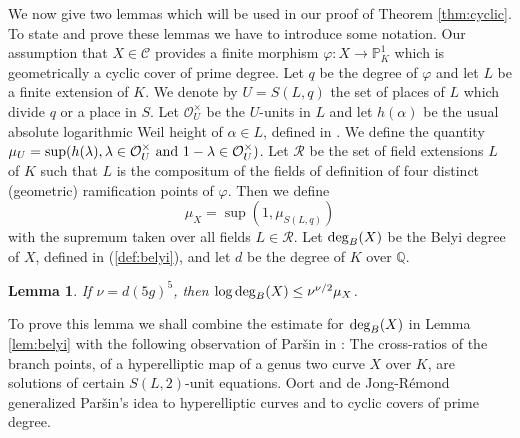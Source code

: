 \documentclass[11pt]{article}
\newtheorem{lemma}[theorem]{Lemma}
\numberwithin{equation}{section}
\def\deg{\textnormal{deg}}
\newcommand {\QQ}  {{\mathbb Q}}
\begin{document}
We now give two lemmas which will be used in our proof of Theorem \ref{thm:cyclic}. 
To state and prove these lemmas we have to introduce some notation. 
Our assumption that $X\in \mathcal C$ provides a finite morphism $\varphi: X\to \mathbb P^1_K$ which is geometrically a cyclic cover of prime degree. 
Let $q$ be the degree of $\varphi$ and let $L$ be a finite extension  of $K$. 
We denote by $U=S(L,q)$ the set of places of $L$ which divide $q$ or a place in $S$. 
Let $\mathcal O_U^{\times}$ be the $U$-units in $L$ and let $h(\alpha)$ be the
 usual absolute logarithmic Weil height of $\alpha\in L$, defined in \cite[1.6.1]{bogu:diophantinegeometry}. 
We define the quantity $\mu_{U}=\sup(h(\lambda), \lambda \in \mathcal O_U^\times \textnormal{ and }  1-\lambda \in \mathcal O_U^{\times})$. 
Let $\mathcal R$ be the set of field extensions $L$ of $K$ such that $L$ is the
compositum of the fields of definition of four distinct (geometric) ramification points of $\varphi$. 
Then we define 
\begin{equation}\label{def:ux}
\mu_X=\sup(1,\mu_{S(L,q)})
\end{equation}
with the supremum taken over all fields $L\in \mathcal R$. Let $\deg_B(X)$ be the Belyi degree of $X$, defined in (\ref{def:belyi}), and let $d$ be the degree of $K$ over $\QQ$.
\begin{lemma}\label{lem:degbux}
If $\nu=d(5g)^5$, then $\log\deg_{B}(X) \leq \nu^{\nu/2}\mu_X$.
\end{lemma}
To prove this lemma we shall combine the estimate for $\deg_B(X)$ in Lemma \ref{lem:belyi} with the following observation of Par{\v{s}}in in \cite{parshin:shafarevich}: 
The cross-ratios of the  branch points, of a hyperelliptic map of a genus two curve $X$ over $K$, are solutions of certain $S(L,2)$-unit equations.
Oort \cite[Lemma 2.1]{oort:shafarevich} and de Jong-R\'emond \cite[Proposition 2.1]{jore:shafarevich} generalized Par{\v{s}}in's idea to hyperelliptic curves  and to cyclic covers of prime degree.
\end{document}

